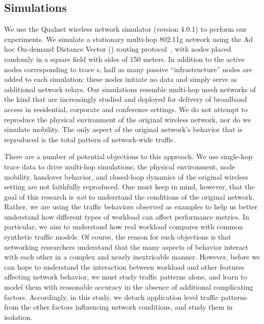 \documentclass[twocolumn,final]{svjour3}
\newcommand{\caps}[1]{{\smaller{#1}}}
\begin{document}
\subsection{Simulations}
\label{sec:simulations}

We use the Qualnet wireless network simulator (version 4.0.1) to perform our experiments. We simulate a stationary multi-hop 802.11g network using the Ad hoc On-demand Distance Vector (\caps{AODV}) routing protocol~\cite{rfc:aodv}, with nodes placed randomly in a square field with sides of 150 meters.
In addition to the active nodes corresponding to trace \caps{IP}s, half as many passive ``infrastructure'' nodes are added to each simulation: these nodes initiate no data and simply serve as additional network relays. Our simulations resemble multi-hop mesh networks of the kind that are increasingly studied and deployed for delivery of broadband access in residential, corporate and conference settings. We do not attempt to reproduce the physical environment of the original wireless network, nor do we simulate mobility. The only aspect of the original network's behavior that is reproduced is the total pattern of network-wide traffic.

There are a number of potential objections to this approach. We use single-hop trace data to drive multi-hop simulations; the physical environment, node mobility, handover behavior, and closed-loop dynamics of the original wireless setting are not faithfully reproduced. One must keep in mind, however, that the goal of this research is \textit{not} to understand the conditions of the original network. Rather, we are using the traffic behaviors observed as examples to help us better understand how different types of workload can affect performance metrics. In particular, we aim to understand how real workload compares with common synthetic traffic models. Of course, the reason for such objections is that networking researchers understand that the many aspects of behavior interact with each other in a complex and nearly inextricable manner. However, before we can hope to understand the interaction between workload and other features affecting network behavior, we must study traffic patterns alone, and learn to model them with reasonable accuracy in the absence of additional complicating factors. Accordingly, in this study, we detach application level traffic patterns from the other factors influencing network conditions, and study them in isolation.
\end{document}
